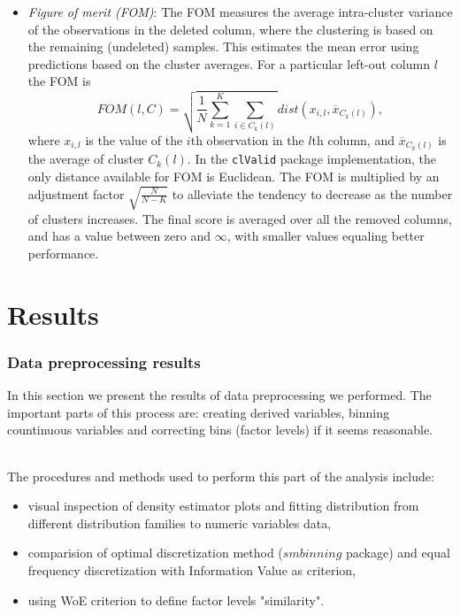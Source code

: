 \documentclass[10pt]{article}\usepackage[]{graphicx}\usepackage[]{color}
\begin{document}
\begin{itemize}
\item \textit{Figure of merit (FOM)}:
\newline \newline
The FOM measures the average intra-cluster variance of the observations in the deleted column,
where the clustering is based on the remaining (undeleted) samples. This estimates the
mean error using predictions based on the cluster averages. For a particular left-out column $l$
the FOM is
$$FOM(l, C)=\sqrt{\frac{1}{N}\sum_{k=1}^{K}\sum_{i \in C_k(l)}}dist(x_{i,l}, \overline{x}_{C_k(l)}),$$
where $x_{i,l}$ is the value of the $i$th observation in the $l$th column, and $\overline{x}_{C_k(l)}$
is the average of cluster $C_k(l)$. 
\newline \newline
In the \texttt{clValid} package implementation,  the only distance available for FOM is Euclidean. The FOM is multiplied by an adjustment factor $\sqrt{\frac{N}{N-K}}$ to alleviate the tendency to decrease as the number of clusters increases. The final score is averaged over all the removed columns, and
has a value between zero and $\infty$, with smaller values equaling better performance.
\end{itemize}











\clearpage
\part{Results}

\clearpage
\section{Data preprocessing results}
In this section we present the results of data preprocessing we performed. The important parts of this process are: creating derived variables, binning countinuous variables and correcting bins (factor levels) if it seems reasonable. 
\paragraph{}
The procedures and methods used to perform this part of the analysis include:
\begin{itemize}
\item visual inspection of density estimator plots and fitting distribution from different distribution families to numeric variables data,
\item comparision of optimal discretization method ($smbinning$ package) and equal frequency discretization with Information Value as criterion,
\item using WoE criterion to define factor levels "similarity".
\end{itemize}
\end{document}
